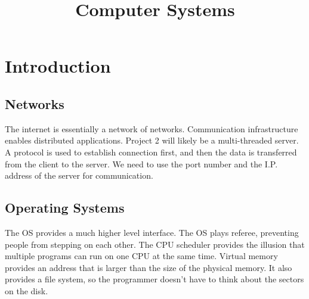 \documentclass[twoside]{article}
\title{Computer Systems}
\date{}
\author{}
\begin{document}
\maketitle
\section{Introduction}
\subsection{Networks}
The internet is essentially a network of networks. Communication infrastructure enables distributed applications. Project 2 will likely be a multi-threaded server. A protocol is used to establish connection first, and then the data is transferred from the client to the server. We need to use the port number and the I.P. address of the server for communication.
\subsection{Operating Systems}
The OS provides a much higher level interface. The OS plays referee, preventing people from stepping on each other. The CPU scheduler provides the illusion that multiple programs can run on one CPU at the same time. Virtual memory provides an address that is larger than the size of the physical memory. It also provides a file system, so the programmer doesn't have to think about the sectors on the disk.
\end{document}
